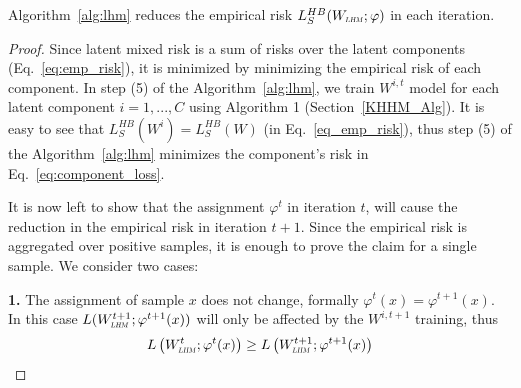\documentclass[twoside,11pt]{article}
\newcommand{\wl}{W_{\textsc{\textsc{\relsize{-2}{\textsl{LHM}}}}}}
\begin{document}
\begin{lemma}
Algorithm~\ref{alg:lhm} %
reduces the empirical risk $L_S^{HB}(\wl;\varphi)$ in each iteration.
\end{lemma}

\begin{proof}
Since latent mixed risk is a sum of risks over the latent components (Eq.~\ref{eq:emp_risk}), it is minimized by minimizing the empirical risk of each component. In step (5) of the Algorithm~\ref{alg:lhm}, we train $W^{i,t}$ model for each latent component $i=1,...,C$  using Algorithm 1  (Section~\ref{KHHM_Alg}). It is easy to see that $L_S^{HB}(W^i) = L^{HB}_S(W)$ (in Eq.~\ref{eq_emp_risk}), thus step (5) of the Algorithm~\ref{alg:lhm} minimizes the component's risk in Eq.~\ref{eq:component_loss}.

It is now left to show that the assignment $\varphi^t$ in iteration $t$, will cause the reduction in the empirical risk in iteration $t+1$. Since the empirical risk is aggregated over positive samples, it is enough to prove the claim for a single sample. We consider two cases:

\noindent\textbf{1.} The  assignment of sample $x$ does not change, formally $\varphi^{t}(x)=\varphi^{t+1}(x)$. \newline
\noindent In this case $L(\wl^{t+1};\varphi^{t+1}(x))$ will only be affected by the $W^{i,t+1}$ training, thus
\begin{equation}
L\left(\wl^t;\varphi^t(x)\right)\ge
L\left(\wl^{t+1};\varphi^{t+1}(x)\right)
\end{equation}


\end{proof}
\end{document}
